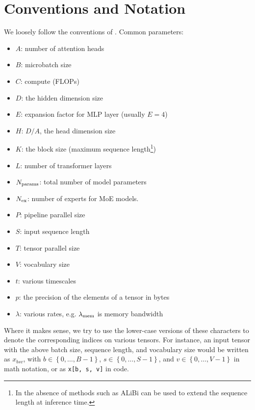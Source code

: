 \documentclass[11pt]{article}
\begin{document}
\newpage

\appendix
\section{Conventions and Notation\label{app_conventions}}


We loosely follow the conventions of \cite{korthikanti2022reducing}.  Common parameters:
\begin{itemize}
	\item $ A $: number of attention heads
	\item $ B $: microbatch size
	\item $ C $: compute (FLOPs)
	\item $ D $: the hidden dimension size
	\item $ E $: expansion factor for MLP layer (usually $ E=4 $)
	\item $ H $: $ D/A $, the head dimension size
	\item $ K $: the block size (maximum sequence length\footnote{In the absence of methods such as         ALiBi \cite{ALiBi}  can be used to extend the sequence length at inference time.})
	\item $ L $: number of transformer layers
	\item $ N _{ {\rm params}  } $: total number of model parameters
	\item $ N _{ {\rm ex}  } $: number of experts for MoE models.
	\item $ P $: pipeline parallel size
	\item $ S $: input sequence length
	\item $ T $: tensor parallel size
	\item $ V $: vocabulary size
	\item $ t $: various timescales
	\item $ p $: the precision of the elements of a tensor in bytes
	\item $ \lambda  $: various rates, e.g. $ \lambda _{ {\rm mem}  } $ is memory bandwidth
\end{itemize}
Where it makes sense, we try to use the lower-case versions of these characters to denote the
corresponding indices on various tensors. For instance, an input tensor with the above batch size,
sequence length, and vocabulary size would be written as $ x _{ bsv } $, with $ b \in \left \{ 0,
	\ldots, B - 1 \right \} $, $ s \in \left \{ 0, \ldots, S - 1\right \} $, and $  v \in \left \{ 0,
	\ldots, V -1\right \}$ in math notation, or as \texttt{x[b, s, v]} in code.
\end{document}

